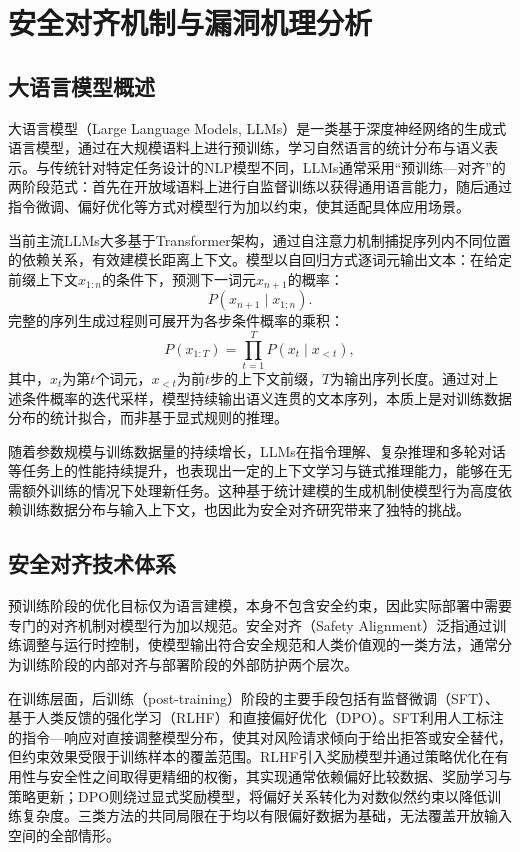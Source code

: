 
\chapter{安全对齐机制与漏洞机理分析}

\section{大语言模型概述}

大语言模型（Large Language Models, LLMs）是一类基于深度神经网络的生成式语言模型，通过在大规模语料上进行预训练，学习自然语言的统计分布与语义表示。与传统针对特定任务设计的NLP模型不同，LLMs通常采用“预训练—对齐”的两阶段范式：首先在开放域语料上进行自监督训练以获得通用语言能力，随后通过指令微调、偏好优化等方式对模型行为加以约束，使其适配具体应用场景\cite{vaswani2017attention}。

当前主流LLMs大多基于Transformer架构，通过自注意力机制捕捉序列内不同位置的依赖关系，有效建模长距离上下文。模型以自回归方式逐词元输出文本：在给定前缀上下文$x_{1:n}$的条件下，预测下一词元$x_{n+1}$的概率：
\begin{equation}
P(x_{n+1} \mid x_{1:n}).
\end{equation}
完整的序列生成过程则可展开为各步条件概率的乘积：
\begin{equation}
P(x_{1:T})=\prod_{t=1}^{T}P(x_t \mid x_{<t}),
\end{equation}
其中，$x_t$为第$t$个词元，$x_{<t}$为前$t$步的上下文前缀，$T$为输出序列长度。通过对上述条件概率的迭代采样，模型持续输出语义连贯的文本序列，本质上是对训练数据分布的统计拟合，而非基于显式规则的推理。

随着参数规模与训练数据量的持续增长，LLMs在指令理解、复杂推理和多轮对话等任务上的性能持续提升，也表现出一定的上下文学习与链式推理能力，能够在无需额外训练的情况下处理新任务。这种基于统计建模的生成机制使模型行为高度依赖训练数据分布与输入上下文，也因此为安全对齐研究带来了独特的挑战。

\section{安全对齐技术体系}

预训练阶段的优化目标仅为语言建模，本身不包含安全约束，因此实际部署中需要专门的对齐机制对模型行为加以规范。安全对齐（Safety Alignment）泛指通过训练调整与运行时控制，使模型输出符合安全规范和人类价值观的一类方法，通常分为训练阶段的内部对齐与部署阶段的外部防护两个层次。

在训练层面，后训练（post-training）阶段的主要手段包括有监督微调（SFT）、基于人类反馈的强化学习（RLHF）和直接偏好优化（DPO）。SFT利用人工标注的指令—响应对直接调整模型分布，使其对风险请求倾向于给出拒答或安全替代，但约束效果受限于训练样本的覆盖范围\cite{ouyang2022instructgpt,stiennon2020summarize}。RLHF引入奖励模型并通过策略优化在有用性与安全性之间取得更精细的权衡，其实现通常依赖偏好比较数据、奖励学习与策略更新\cite{christiano2017preferences,ouyang2022instructgpt}；DPO则绕过显式奖励模型，将偏好关系转化为对数似然约束以降低训练复杂度\cite{rafailov2023dpo,hong2024orpo}。三类方法的共同局限在于均以有限偏好数据为基础，无法覆盖开放输入空间的全部情形。

